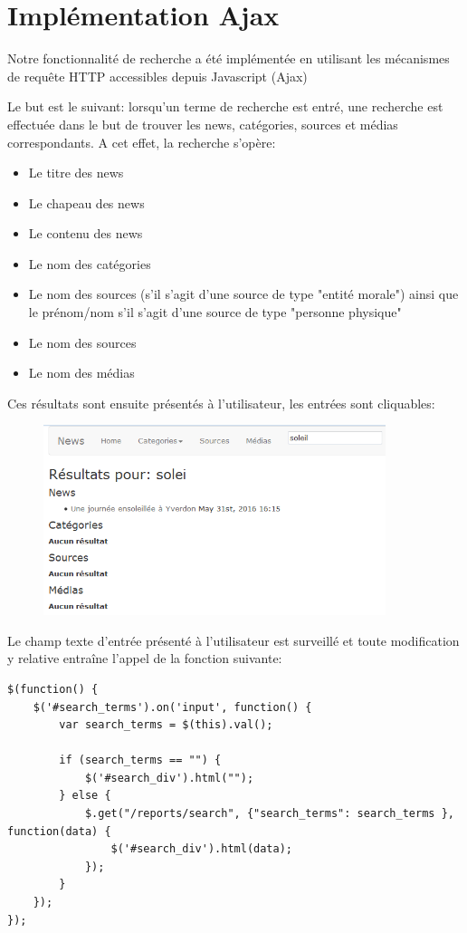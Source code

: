 \documentclass{article}
\begin{document}
\section{Implémentation Ajax}

Notre fonctionnalité de recherche a été implémentée en utilisant les mécanismes de requête HTTP accessibles depuis Javascript (Ajax)

Le but est le suivant: lorsqu'un terme de recherche est entré, une recherche est effectuée dans le but de trouver les news, catégories, sources et médias correspondants.
A cet effet, la recherche s'opère:
\begin{itemize}
\item Le titre des news
\item Le chapeau des news
\item Le contenu des news
\item Le nom des catégories
\item Le nom des sources (s'il s'agit d'une source de type "entité morale") ainsi que le prénom/nom s'il s'agit d'une source de type "personne physique"
\item Le nom des sources
\item Le nom des médias
\end{itemize}

Ces résultats sont ensuite présentés à l'utilisateur, les entrées sont cliquables:

\begin{figure}[h]
  \centering
  \includegraphics[width=10cm]{recherche_ajax}
\end{figure}

Le champ texte d'entrée présenté à l'utilisateur est surveillé et toute modification y relative entraîne l'appel de la fonction suivante:

\begin{lstlisting}
$(function() {
	$('#search_terms').on('input', function() {
		var search_terms = $(this).val();
		
		if (search_terms == "") {
			$('#search_div').html("");
		} else {
			$.get("/reports/search", {"search_terms": search_terms }, function(data) {
				$('#search_div').html(data);
			});
		}
	});
});
\end{lstlisting}
\end{document}
